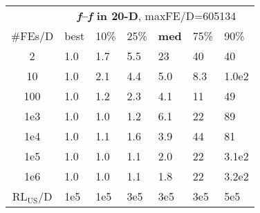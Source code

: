 \begin{tabular}{c|llllll}
 & \multicolumn{6}{|c}{\textbf{\textit{f}\raisebox{-0.35ex}{1}--\textit{f}\raisebox{-0.35ex}{24} in 20-D}, maxFE/D=605134}\\
\#FEs/D & best & 10\% & 25\% & \textbf{med} & 75\% & 90\%\\
2 & \hspace*{1ex}1.0 & \hspace*{1ex}1.7 & \hspace*{1ex}5.5 & 23 & 40 & 40\\
10 & \hspace*{1ex}1.0 & \hspace*{1ex}2.1 & \hspace*{1ex}4.4 & \hspace*{1ex}5.0 & \hspace*{1ex}8.3 & 1.0e2\\
100 & \hspace*{1ex}1.0 & \hspace*{1ex}1.2 & \hspace*{1ex}2.3 & \hspace*{1ex}4.1 & 11 & 49\\
1e3 & \hspace*{1ex}1.0 & \hspace*{1ex}1.0 & \hspace*{1ex}1.2 & \hspace*{1ex}6.1 & 22 & 89\\
1e4 & \hspace*{1ex}1.0 & \hspace*{1ex}1.1 & \hspace*{1ex}1.6 & \hspace*{1ex}3.9 & 44 & 81\\
1e5 & \hspace*{1ex}1.0 & \hspace*{1ex}1.0 & \hspace*{1ex}1.1 & \hspace*{1ex}2.0 & 22 & 3.1e2\\
1e6 & \hspace*{1ex}1.0 & \hspace*{1ex}1.0 & \hspace*{1ex}1.1 & \hspace*{1ex}1.8 & 22 & 3.2e2\\
$\text{RL}_{\text{US}}$/D & 1e5 & 1e5 & 3e5 & 3e5 & 3e5 & 5e5
\end{tabular}
